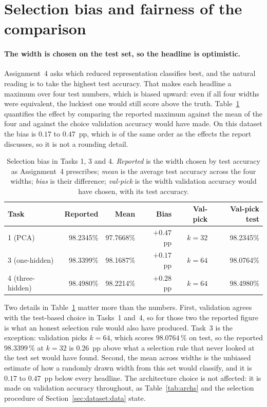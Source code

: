 \documentclass[11pt,a4paper]{article}
\begin{document}
\section{Selection bias and fairness of the comparison}\label{sec:selbias}
\paragraph{The width is chosen on the test set, so the headline is optimistic.}
Assignment~4 asks which reduced representation classifies best, and the natural reading is to take
the highest test accuracy.  That makes each headline a maximum over four test numbers, which is
biased upward: even if all four widths were equivalent, the luckiest one would
still score above the truth.  Table~\ref{tab:bias} quantifies the effect by comparing the reported
maximum against the mean of the four and against the choice validation accuracy would have made.
On this dataset the bias is $0.17$ to $0.47$~pp, which is of the same order as the effects the
report discusses, so it is not a rounding detail.

\begin{table}[htbp]\centering
\caption{Selection bias in Tasks 1, 3 and 4.  \emph{Reported} is the width chosen by test
accuracy as Assignment~4 prescribes; \emph{mean} is the average test accuracy across the four
widths; \emph{bias} is their difference; \emph{val-pick} is the width validation accuracy would
have chosen, with its test accuracy.}\label{tab:bias}
\begin{tabular}{@{}lrrrrr@{}}
\toprule Task & Reported & Mean & Bias & Val-pick & Val-pick test \\ \midrule
1  (PCA)         & 98.2345\% & 97.7668\% & $+0.47$~pp & $k=32$ & 98.2345\% \\
3  (one-hidden)  & 98.3399\% & 98.1687\% & $+0.17$~pp & $k=64$ & 98.0764\% \\
4  (three-hidden)& 98.4980\% & 98.2214\% & $+0.28$~pp & $k=64$ & 98.4980\% \\
\bottomrule
\end{tabular}
\end{table}

Two details in Table~\ref{tab:bias} matter more than the numbers.  First, validation agrees with
the test-based choice in Tasks~1 and~4, so for those two the reported figure is what an honest
selection rule would also have produced.  Task~3 is the exception: validation picks $k=64$, which
scores $98.0764\,\%$ on test, so the reported $98.3399\,\%$ at $k=32$ is $0.26$~pp above what a
selection rule that never looked at the test set would have found.  Second, the mean across widths
is the unbiased estimate of how a randomly drawn width from this set would classify, and it is
$0.17$ to $0.47$~pp below every headline.  The architecture choice is not affected: it is made on
validation accuracy throughout, as Table~\ref{tab:archs} and the selection procedure of
Section~\ref{sec:dataset:data} state.
\end{document}
